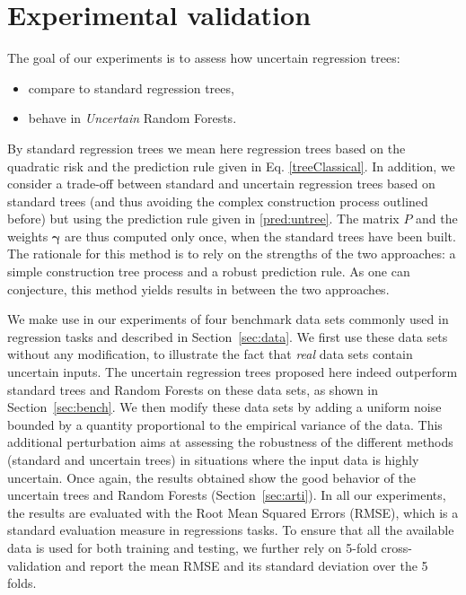 \documentclass[twoside,11pt]{article}
\begin{document}
\section{Experimental validation}
\label{sec:exps}


The goal of our experiments is to assess how uncertain regression trees:
%
\begin{itemize}
    \item compare to standard regression trees,
    \item behave in \textit{Uncertain} Random Forests.
\end{itemize}
%
By standard regression trees we mean here regression trees based on the quadratic risk and the prediction rule given in Eq. \eqref{treeClassical}. In addition, we consider a trade-off between standard and uncertain regression trees based on standard trees (and thus avoiding the complex construction process outlined before) but using the prediction rule given in \eqref{pred:untree}. The matrix $P$ and the weights $\boldsymbol{\gamma}$ are thus computed only once, when the standard trees have been built. The rationale for this method is to rely on the strengths of the two approaches: a simple construction tree process and a robust prediction rule. As one can conjecture, this method yields results in between the two approaches.

We make use in our experiments of four benchmark data sets commonly used in regression tasks and described in Section~\ref{sec:data}. We first use these data sets without any modification, to illustrate the fact that \textit{real} data sets contain uncertain inputs. The uncertain regression trees proposed here indeed outperform standard trees and Random Forests on these data sets, as shown in Section~\ref{sec:bench}. We then modify these data sets by adding a uniform noise bounded by a quantity proportional to the empirical variance of the data. This additional perturbation aims at assessing the robustness of the different methods (standard and uncertain trees) in situations where the input data is highly uncertain. Once again, the results obtained show the good behavior of the uncertain trees and Random Forests (Section~\ref{sec:arti}). In all our experiments, the results are evaluated with the Root Mean Squared Errors (RMSE), which is a standard evaluation measure in regressions tasks. To ensure that all the available data is used for both training and testing, we further rely on 5-fold cross-validation and report the mean RMSE and its standard deviation over the 5 folds.
\end{document}
